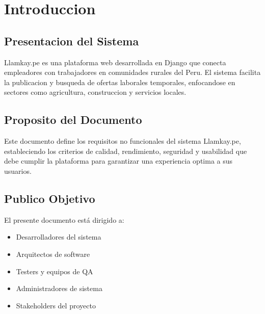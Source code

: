 \documentclass[12pt, a4paper]{article}
\begin{document}
\section{Introduccion}

\subsection{Presentacion del Sistema}

\hspace{1.27cm}Llamkay.pe es una plataforma web desarrollada en Django que conecta empleadores con trabajadores en comunidades rurales del Peru. El sistema facilita la publicacion y busqueda de ofertas laborales temporales, enfocandose en sectores como agricultura, construccion y servicios locales.

\subsection{Proposito del Documento}

\hspace{1.27cm}Este documento define los requisitos no funcionales del sistema Llamkay.pe, estableciendo los criterios de calidad, rendimiento, seguridad y usabilidad que debe cumplir la plataforma para garantizar una experiencia optima a sus usuarios.

\subsection{Publico Objetivo}

\hspace{1.27cm}El presente documento está dirigido a:

\begin{itemize}
    \item Desarrolladores del sistema
    \item Arquitectos de software
    \item Testers y equipos de QA
    \item Administradores de sistema
    \item Stakeholders del proyecto
\end{itemize}

\end{document}

